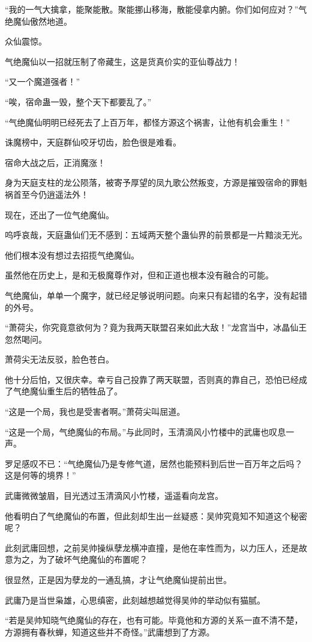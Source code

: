 \begin{this_body}
“我的一气大擒拿，能聚能散。聚能挪山移海，散能侵拿内腑。你们如何应对？”气绝魔仙傲然地道。

众仙震惊。

气绝魔仙以一招就压制了帝藏生，这是货真价实的亚仙尊战力！

“又一个魔道强者！”

“唉，宿命蛊一毁，整个天下都要乱了。”

“气绝魔仙明明已经死去了上百万年，都怪方源这个祸害，让他有机会重生！”

诛魔榜中，天庭群仙咬牙切齿，脸色很是难看。

宿命大战之后，正消魔涨！

身为天庭支柱的龙公陨落，被寄予厚望的凤九歌公然叛变，方源是摧毁宿命的罪魁祸首至今仍逍遥法外！

现在，还出了一位气绝魔仙。

呜呼哀哉，天庭蛊仙们无不感到：五域两天整个蛊仙界的前景都是一片黯淡无光。

他们根本没有想过去招揽气绝魔仙。

虽然他在历史上，是和无极魔尊作对，但和正道也根本没有融合的可能。

气绝魔仙，单单一个魔字，就已经足够说明问题。向来只有起错的名字，没有起错的外号。

“萧荷尖，你究竟意欲何为？竟为我两天联盟召来如此大敌！”龙宫当中，冰晶仙王忽然喝问。

萧荷尖无法反驳，脸色苍白。

他十分后怕，又很庆幸。幸亏自己投靠了两天联盟，否则真的靠自己，恐怕已经成了气绝魔仙重生后的牺牲品了。

“这是一个局，我也是受害者啊。”萧荷尖叫屈道。

“这是一个局，气绝魔仙的布局。”与此同时，玉清滴风小竹楼中的武庸也叹息一声。

罗足感叹不已：“气绝魔仙乃是专修气道，居然也能预料到后世一百万年之后吗？这是何等的境界！”

武庸微微皱眉，目光透过玉清滴风小竹楼，遥遥看向龙宫。

他看明白了气绝魔仙的布置，但此刻却生出一丝疑惑：吴帅究竟知不知道这个秘密呢？

此刻武庸回想，之前吴帅操纵孽龙横冲直撞，是他在率性而为，以力压人，还是故意为之，为了破坏气绝魔仙的布置呢？

很显然，正是因为孽龙的一通乱搞，才让气绝魔仙提前出世。

武庸乃是当世枭雄，心思缜密，此刻越想越觉得吴帅的举动似有猫腻。

“若是吴帅知晓气绝魔仙的存在，也有可能。毕竟他和方源的关系一直不清不楚，方源拥有春秋蝉，知道这些并不奇怪。”武庸想到了方源。


\end{this_body}
